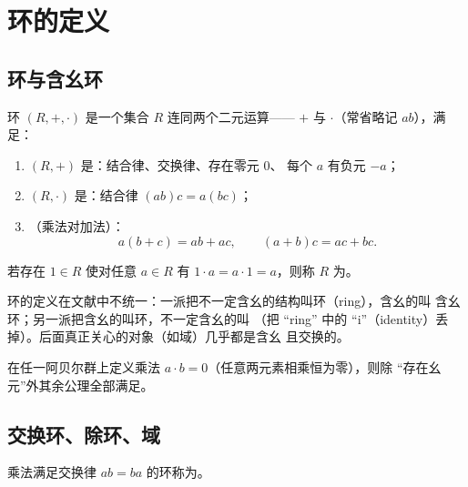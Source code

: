 \section{环的定义}\label{sec:rings}

\subsection{环与含幺环}

\begin{definition}[环（Ring）]
环 $(R, +, \cdot)$ 是一个集合 $R$ 连同两个二元运算—— $+$
与 $\cdot$（常省略记 $ab$），满足：
\begin{enumerate}[leftmargin=1.6em,itemsep=2pt]
  \item $(R, +)$ 是：结合律、交换律、存在零元 $0$、
        每个 $a$ 有负元 $-a$；
  \item $(R, \cdot)$ 是：结合律 $(ab)c = a(bc)$；
  \item {}（乘法对加法）：
        \[
          a(b+c) = ab + ac, \qquad (a+b)c = ac + bc.
        \]
\end{enumerate}
\end{definition}

\begin{definition}[含幺环]
若存在 $1\in R$ 使对任意 $a\in R$ 有 $1\cdot a = a\cdot 1 = a$，则称 $R$
为。
\end{definition}

\begin{remark}[术语说明]
环的定义在文献中不统一：一派把不一定含幺的结构叫环（ring），含幺的叫
含幺环；另一派把含幺的叫环，不一定含幺的叫 （把 ``ring''
中的 ``i''（identity）丢掉）。后面真正关心的对象（如域）几乎都是含幺
且交换的。
\end{remark}

\begin{example}[无幺元的环]
在任一阿贝尔群上定义乘法 $a\cdot b = 0$（任意两元素相乘恒为零），则除
“存在幺元”外其余公理全部满足。
\end{example}

\subsection{交换环、除环、域}

\begin{definition}[交换环]
乘法满足交换律 $ab = ba$ 的环称为。
\end{definition}

